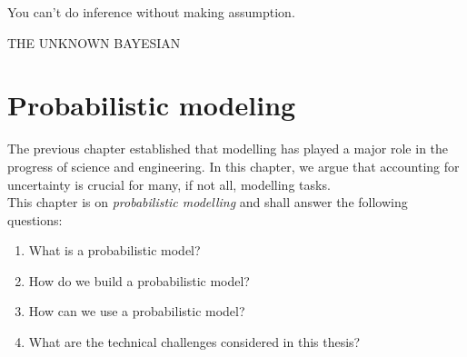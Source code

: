 {\centering
\parbox{\textwidth}{%
  \raggedright{\normal\itshape%

  You can't do inference without making assumption.\par\bigskip
  }
  \raggedleft\normal\MakeUppercase{The unknown Bayesian}\par%
}}

\chapter{Probabilistic modeling}\label{ch:02}

\begin{chapter_outline}
  The previous chapter established that modelling has played a major role in the progress of science and engineering.
  In this chapter, we argue that accounting for uncertainty is crucial for many, if not all, modelling tasks.
  \\
  This chapter is on \textit{probabilistic modelling} and shall answer the following questions:
  \begin{enumerate}
    \item What is a probabilistic model?
    \item How do we build a probabilistic model?
    \item How can we use a probabilistic model?
    \item What are the technical challenges considered in this thesis?
  \end{enumerate}

\end{chapter_outline}

